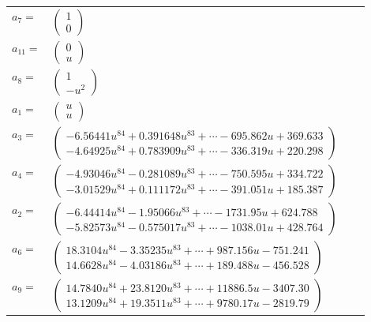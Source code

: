 \documentclass[1p]{elsarticle_modified}
\theoremstyle{definition}
\begin{document}
\begin{tabular}{m{7pt} m{180pt} m{7pt} m{180pt} }
\flushright $a_{7}=$&$\begin{pmatrix}1\\0\end{pmatrix}$ \\
\flushright $a_{11}=$&$\begin{pmatrix}0\\u\end{pmatrix}$ \\
\flushright $a_{8}=$&$\begin{pmatrix}1\\- u^2\end{pmatrix}$ \\
\flushright $a_{1}=$&$\begin{pmatrix}u\\u\end{pmatrix}$ \\
\flushright $a_{3}=$&$\begin{pmatrix}-6.56441 u^{84}+0.391648 u^{83}+\cdots-695.862 u+369.633\\-4.64925 u^{84}+0.783909 u^{83}+\cdots-336.319 u+220.298\end{pmatrix}$ \\
\flushright $a_{4}=$&$\begin{pmatrix}-4.93046 u^{84}-0.281089 u^{83}+\cdots-750.595 u+334.722\\-3.01529 u^{84}+0.111172 u^{83}+\cdots-391.051 u+185.387\end{pmatrix}$ \\
\flushright $a_{2}=$&$\begin{pmatrix}-6.44414 u^{84}-1.95066 u^{83}+\cdots-1731.95 u+624.788\\-5.82573 u^{84}-0.575017 u^{83}+\cdots-1038.01 u+428.764\end{pmatrix}$ \\
\flushright $a_{6}=$&$\begin{pmatrix}18.3104 u^{84}-3.35235 u^{83}+\cdots+987.156 u-751.241\\14.6628 u^{84}-4.03186 u^{83}+\cdots+189.488 u-456.528\end{pmatrix}$ \\
\flushright $a_{9}=$&$\begin{pmatrix}14.7840 u^{84}+23.8120 u^{83}+\cdots+11886.5 u-3407.30\\13.1209 u^{84}+19.3511 u^{83}+\cdots+9780.17 u-2819.79\end{pmatrix}$ \\

\end{tabular}
\end{document}
